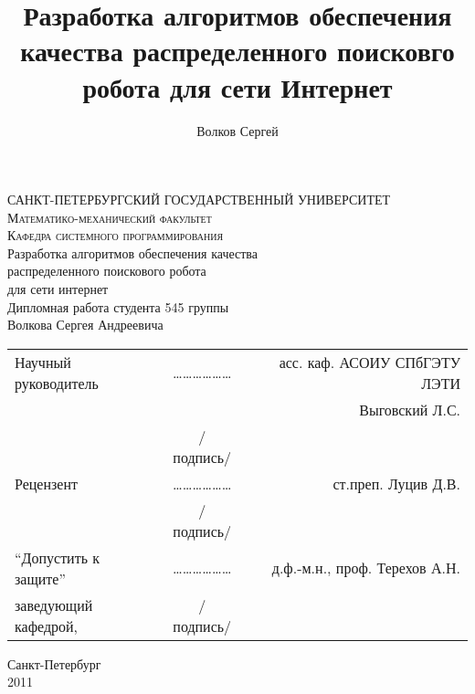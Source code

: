 \documentclass[a4paper,10pt]{report}
\title{Разработка алгоритмов обеспечения качества распределенного поисковго робота для сети Интернет}
\author{Волков Сергей}
\begin{document}
\begin{titlepage}
\begin{center}

\textsc{САНКТ-ПЕТЕРБУРГСКИЙ ГОСУДАРСТВЕННЫЙ УНИВЕРСИТЕТ}\\
\textsc{Математико-механический факультет}\\[1.0cm]

\textsc{Кафедра системного программирования}\\[3.0cm]

{ \LARGE Разработка алгоритмов обеспечения качества}\\[1.0cm]
{ \LARGE распределенного поискового робота}\\[1.0cm]
{ \LARGE для сети интернет}\\[1.0cm]
{Дипломная работа студента 545 группы \\ Волкова Сергея Андреевича}\\[3.0cm]

\begin{tabular}{lcr}
Научный руководитель & ……………… & асс. каф. АСОИУ СПбГЭТУ ЛЭТИ\\ & & Выговский Л.С. \\
& /подпись/ & \\[1.0cm]
Рецензент            & ……………… & ст.преп. Луцив Д.В. \\
& /подпись/ & \\[1.0cm]
``Допустить к защите'' & ……………… & д.ф.-м.н., проф. Терехов А.Н. \\
заведующий кафедрой, & /подпись/ & \\
\end{tabular}

\vfill

{\large Санкт-Петербург \\ 2011}

\end{center}
\end{titlepage}
\end{document}
